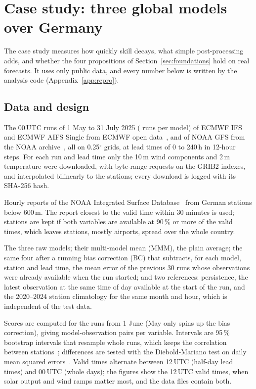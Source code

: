 \section{Case study: three global models over Germany}
\label{sec:case}

The case study measures how quickly skill decays, what simple post-processing adds, and whether the four propositions of Section~\ref{sec:foundations} hold on real forecasts. It uses only public data, and every number below is written by the analysis code (Appendix~\ref{app:repro}).

\subsection{Data and design}

 The 00\,UTC runs of 1 May to 31 July 2025 (\valNumRuns{} runs per model) of ECMWF IFS and ECMWF AIFS Single from ECMWF open data~\cite{ecmwf2025opendata}, and of NOAA GFS from the NOAA archive~\cite{noaa2025gfs}, all on 0.25$^\circ$ grids, at lead times of 0 to 240\,h in 12-hour steps. For each run and lead time only the 10\,m wind components and 2\,m temperature were downloaded, with byte-range requests on the GRIB2 indexes, and interpolated bilinearly to the stations; every download is logged with its SHA-256 hash.

 Hourly reports of the NOAA Integrated Surface Database~\cite{smith2011isd} from German stations below 600\,m. The report closest to the valid time within 30 minutes is used; stations are kept if both variables are available at 90\,\% or more of the valid times, which leaves \valNumStations{} stations, mostly airports, spread over the whole country.

 The three raw models; their multi-model mean (MMM), the plain average; the same four after a running bias correction (BC) that subtracts, for each model, station and lead time, the mean error of the previous 30 runs whose observations were already available when the run started; and two references: persistence, the latest observation at the same time of day available at the start of the run, and the 2020--2024 station climatology for the same month and hour, which is independent of the test data.

 Scores are computed for the \valNumEvalRuns{} runs from 1 June (May only spins up the bias correction), giving \valNumEvalPairs{} model-observation pairs per variable. Intervals are 95\,\% bootstrap intervals that resample whole runs, which keeps the correlation between stations~\cite{kunsch1989bootstrap}; differences are tested with the Diebold-Mariano test on daily mean squared errors~\cite{diebold1995comparing}. Valid times alternate between 12\,UTC (half-day lead times) and 00\,UTC (whole days); the figures show the 12\,UTC valid times, when solar output and wind ramps matter most, and the data files contain both.

